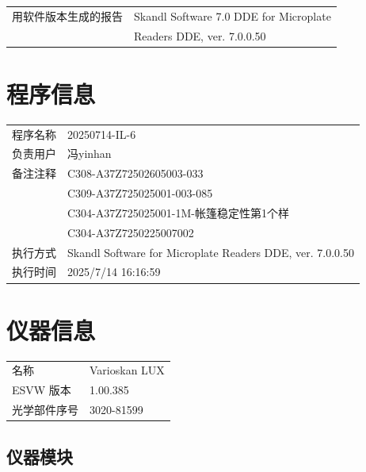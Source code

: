 \documentclass[UTF8,10pt,a4paper,fontset=fandol]{ctexart}
\newcommand{\fieldvalue}[1]{#1}
\begin{document}
\begin{tabular}{ll}
用软件版本生成的报告 &
\fieldvalue{Skandl Software 7.0 DDE for Microplate}\\
& \fieldvalue{Readers DDE, ver. 7.0.0.50}
\end{tabular}

\section*{程序信息}

\begin{tabular}{ll}
程序名称 &
\fieldvalue{20250714-IL-6}\\
负责用户 &
\fieldvalue{冯yinhan}\\
备注注释 &
\fieldvalue{C308-A37Z72502605003-033}\\
&
\fieldvalue{C309-A37Z725025001-003-085}\\
&
\fieldvalue{C304-A37Z725025001-1M-帐篷稳定性第1个样}\\
&
\fieldvalue{C304-A37Z7250225007002}\\
执行方式 &
\fieldvalue{Skandl Software for Microplate Readers DDE, ver. 7.0.0.50}\\
执行时间 &
\fieldvalue{2025/7/14 16:16:59}
\end{tabular}

\section*{仪器信息}

\begin{tabular}{ll}
名称 &
\fieldvalue{Varioskan LUX}\\
ESVW 版本 &
\fieldvalue{1.00.385}\\
光学部件序号 &
\fieldvalue{3020-81599}
\end{tabular}

\subsection*{仪器模块}
\end{document}
